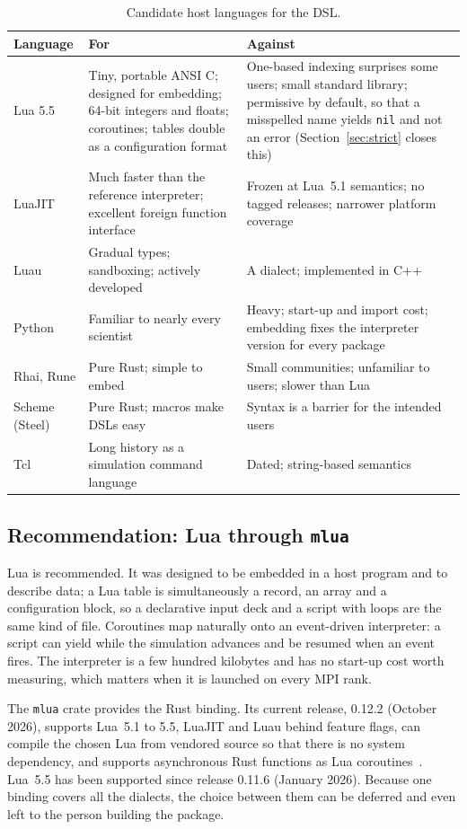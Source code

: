 \documentclass[11pt,a4paper]{article}
\newcommand{\code}[1]{\texttt{#1}}
\begin{document}
\begin{table}[ht]
\centering
\small
\begin{tabularx}{\textwidth}{@{}l L L@{}}
\toprule
Language & For & Against \\
\midrule
Lua 5.5 & Tiny, portable ANSI C; designed for embedding; 64-bit integers and floats; coroutines; tables double as a configuration format & One-based indexing surprises some users; small standard library; permissive by default, so that a misspelled name yields \code{nil} and not an error (Section~\ref{sec:strict} closes this) \\
LuaJIT & Much faster than the reference interpreter; excellent foreign function interface & Frozen at Lua~5.1 semantics; no tagged releases; narrower platform coverage \\
Luau & Gradual types; sandboxing; actively developed & A dialect; implemented in C++ \\
Python & Familiar to nearly every scientist & Heavy; start-up and import cost; embedding fixes the interpreter version for every package \\
Rhai, Rune & Pure Rust; simple to embed & Small communities; unfamiliar to users; slower than Lua \\
Scheme (Steel) & Pure Rust; macros make DSLs easy & Syntax is a barrier for the intended users \\
Tcl & Long history as a simulation command language & Dated; string-based semantics \\
\bottomrule
\end{tabularx}
\caption{Candidate host languages for the DSL.}
\label{tab:script}
\end{table}

\subsection{Recommendation: Lua through \texttt{mlua}}

Lua is recommended.  It was designed to be embedded in a host program and to
describe data; a Lua table is simultaneously a record, an array and a
configuration block, so a declarative input deck and a script with loops are
the same kind of file.  Coroutines map naturally onto an event-driven
interpreter: a script can yield while the simulation advances and be resumed
when an event fires.  The interpreter is a few hundred kilobytes and has no
start-up cost worth measuring, which matters when it is launched on every MPI
rank.

The \code{mlua} crate provides the Rust binding.  Its current release, 0.12.2
(October 2026), supports Lua~5.1 to 5.5, LuaJIT and Luau behind feature
flags, can compile the chosen Lua from vendored source so that there is no
system dependency, and supports asynchronous Rust functions as Lua
coroutines~\cite{mlua}.  Lua~5.5 has been supported since release 0.11.6
(January 2026).  Because one binding covers all the dialects, the
choice between them can be deferred and even left to the person building the
package.
\end{document}
